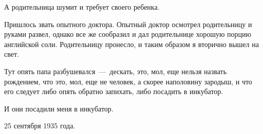 А родительница шумит и требует своего ребенка.

Пришлось звать опытного доктора. Опытный доктор осмотрел родительницу и руками развел, однако все же сообразил и дал родительнице хорошую порцию английской соли. Родительницу пронесло, и таким образом я вторично вышел на свет.

Тут опять папа разбушевался\ ---~дескать, это, мол, еще нельзя назвать рождением, что это, мол, еще не человек, а скорее наполовину зародыш, и что его следует либо опять обратно запихать, либо посадить в инкубатор.

И они посадили меня в инкубатор.

25 сентября 1935 года.
